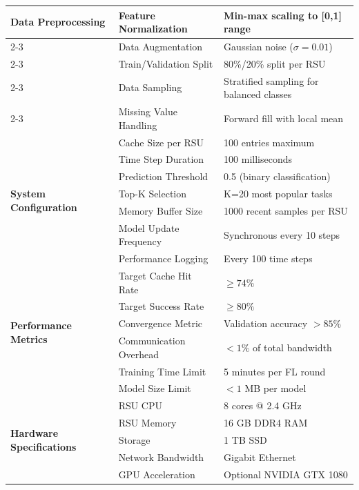 \documentclass[11pt]{article}
\begin{document}
\begin{longtable}{|p{4cm}|p{3cm}|p{8cm}|}
\multirow{5}{*}{\textbf{Data Preprocessing}} 
& Feature Normalization & Min-max scaling to [0,1] range \\
\cline{2-3}
& Data Augmentation & Gaussian noise ($\sigma=0.01$) \\
\cline{2-3}
& Train/Validation Split & 80\%/20\% split per RSU \\
\cline{2-3}
& Data Sampling & Stratified sampling for balanced classes \\
\cline{2-3}
& Missing Value Handling & Forward fill with local mean \\
\hline

\multirow{7}{*}{\textbf{System Configuration}} 
& Cache Size per RSU & 100 entries maximum \\
\cline{2-3}
& Time Step Duration & 100 milliseconds \\
\cline{2-3}
& Prediction Threshold & 0.5 (binary classification) \\
\cline{2-3}
& Top-K Selection & K=20 most popular tasks \\
\cline{2-3}
& Memory Buffer Size & 1000 recent samples per RSU \\
\cline{2-3}
& Model Update Frequency & Synchronous every 10 steps \\
\cline{2-3}
& Performance Logging & Every 100 time steps \\
\hline

\multirow{6}{*}{\textbf{Performance Metrics}} 
& Target Cache Hit Rate & $\geq 74\%$ \\
\cline{2-3}
& Target Success Rate & $\geq 80\%$ \\
\cline{2-3}
& Convergence Metric & Validation accuracy $> 85\%$ \\
\cline{2-3}
& Communication Overhead & $< 1\%$ of total bandwidth \\
\cline{2-3}
& Training Time Limit & 5 minutes per FL round \\
\cline{2-3}
& Model Size Limit & $< 1$ MB per model \\
\hline

\multirow{5}{*}{\textbf{Hardware Specifications}} 
& RSU CPU & 8 cores @ 2.4 GHz \\
\cline{2-3}
& RSU Memory & 16 GB DDR4 RAM \\
\cline{2-3}
& Storage & 1 TB SSD \\
\cline{2-3}
& Network Bandwidth & Gigabit Ethernet \\
\cline{2-3}
& GPU Acceleration & Optional NVIDIA GTX 1080 \\
\hline

\end{longtable}
\end{document}
